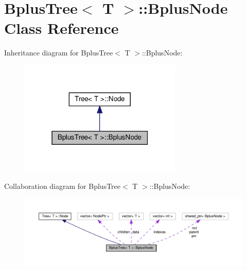 \hypertarget{classBplusTree_1_1BplusNode}{}\section{Bplus\+Tree$<$ T $>$\+:\+:Bplus\+Node Class Reference}
\label{classBplusTree_1_1BplusNode}


Inheritance diagram for Bplus\+Tree$<$ T $>$\+:\+:Bplus\+Node\+:
\nopagebreak
\begin{figure}[H]
\begin{center}
\leavevmode
\includegraphics[width=219pt]{classBplusTree_1_1BplusNode__inherit__graph}
\end{center}
\end{figure}


Collaboration diagram for Bplus\+Tree$<$ T $>$\+:\+:Bplus\+Node\+:
\nopagebreak
\begin{figure}[H]
\begin{center}
\leavevmode
\includegraphics[width=350pt]{classBplusTree_1_1BplusNode__coll__graph}
\end{center}
\end{figure}
